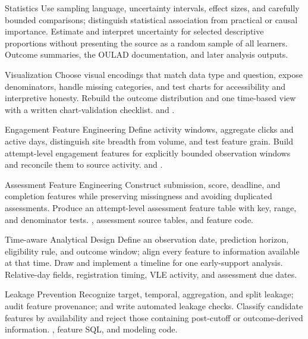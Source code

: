 \ForthcomingChapter
  {Statistics}
  {Use sampling language, uncertainty intervals, effect sizes, and carefully
   bounded comparisons; distinguish statistical association from practical or
   causal importance.}
  {Estimate and interpret uncertainty for selected descriptive proportions
   without presenting the source as a random sample of all learners.}
  {Outcome summaries, the OULAD documentation, and later analysis outputs.}

\ForthcomingChapter
  {Visualization}
  {Choose visual encodings that match data type and question, expose
   denominators, handle missing categories, and test charts for accessibility
   and interpretive honesty.}
  {Rebuild the outcome distribution and one time-based view with a written
   chart-validation checklist.}
  { and
   .}

\ForthcomingChapter
  {Engagement Feature Engineering}
  {Define activity windows, aggregate clicks and active days, distinguish site
   breadth from volume, and test feature grain.}
  {Build attempt-level engagement features for explicitly bounded observation
   windows and reconcile them to source activity.}
  { and
   .}

\ForthcomingChapter
  {Assessment Feature Engineering}
  {Construct submission, score, deadline, and completion features while
   preserving missingness and avoiding duplicated assessments.}
  {Produce an attempt-level assessment feature table with key, range, and
   denominator tests.}
  {, assessment source tables, and feature
   code.}

\ForthcomingChapter
  {Time-aware Analytical Design}
  {Define an observation date, prediction horizon, eligibility rule, and
   outcome window; align every feature to information available at that time.}
  {Draw and implement a timeline for one early-support analysis.}
  {Relative-day fields, registration timing, VLE activity, and assessment due
   dates.}

\ForthcomingChapter
  {Leakage Prevention}
  {Recognize target, temporal, aggregation, and split leakage; audit feature
   provenance; and write automated leakage checks.}
  {Classify candidate features by availability and reject those containing
   post-cutoff or outcome-derived information.}
  {, feature SQL, and modeling code.}

